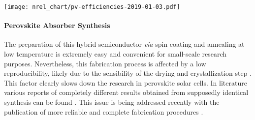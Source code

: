 	\begin{SCfigure}
		\centering
		\texttt{[image: nrel\_chart/pv-efficiencies-2019-01-03.pdf]}
		\label{fig:nrel_chart}
	\end{SCfigure}

%


\begin{figure}
\end{figure}


	\paragraph{Perovskite Absorber Synthesis}
	The preparation of this hybrid semiconductor \textsl{via} spin coating and annealing at low temperature is extremely easy and convenient for small-scale research purposes.
	Nevertheless, this fabrication process is affected by a low reproducibility, likely due to the sensibility of the drying and crystallization step \cite{Pockett2015}.
	This factor clearly slows down the research in perovskite solar cells.
	In literature various reports of completely different results obtained from supposedly identical synthesis can be found \cite{Pockett2015,Gottesman2014}.
	This issue is being addressed recently with the publication of more reliable and complete fabrication procedures \cite{Saliba2018}.

